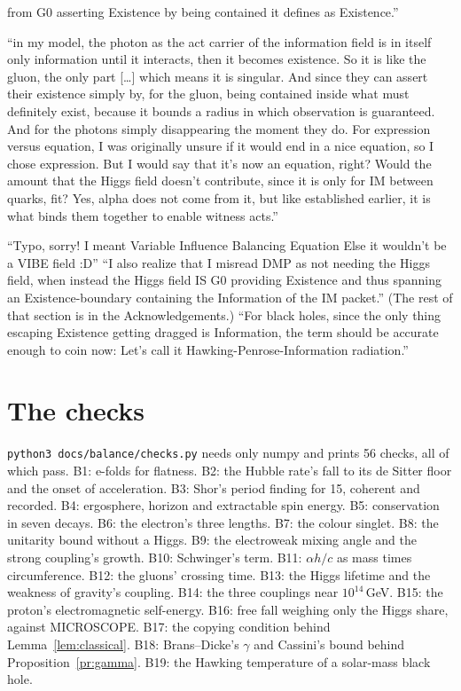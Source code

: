 \documentclass[11pt,a4paper]{article}
\theoremstyle{definition}
\begin{document}
\begin{description}[style=unboxed,leftmargin=0pt,font=\normalfont\bfseries]
from G0 asserting Existence by being contained it defines as Existence.''
\item[22:18Z.] ``in my model, the photon as the act carrier of the information field is in itself only information until it interacts, then
it becomes existence. So it is like the gluon, the only part [\dots] which means it is singular. And since they can assert their existence
simply by, for the gluon, being contained inside what must definitely exist, because it bounds a radius in which observation is
guaranteed. And for the photons simply disappearing the moment they do. For expression versus equation, I was originally unsure if it
would end in a nice equation, so I chose expression. But I would say that it's now an equation, right? Would the amount that the Higgs field
doesn't contribute, since it is only for IM between quarks, fit? Yes, alpha does not come from it, but like established earlier, it is what
binds them together to enable witness acts.''
\item[23:43Z.] ``Typo, sorry! I meant Variable Influence Balancing Equation Else it wouldn't be a VIBE field :D'' ``I also realize that
I misread DMP as not needing the Higgs field, when instead the Higgs field IS G0 providing Existence and thus spanning an
Existence-boundary containing the Information of the IM packet.'' (The rest of that section is in the Acknowledgements.) ``For black
holes, since the only thing escaping Existence getting dragged is Information, the term should be accurate enough to coin now: Let's call
it Hawking-Penrose-Information radiation.''
\end{description}

\section{The checks}\label{app:checks}

\texttt{python3 docs/balance/checks.py} needs only numpy and prints 56 checks, all of which pass. B1: e-folds for flatness. B2: the Hubble
rate's fall to its de Sitter floor and the onset of acceleration. B3: Shor's period finding for 15, coherent and recorded. B4: ergosphere,
horizon and extractable spin energy. B5: conservation in seven decays. B6: the electron's three lengths. B7: the colour singlet. B8: the
unitarity bound without a Higgs. B9: the electroweak mixing angle and the strong coupling's growth. B10: Schwinger's term. B11: $\alpha h/c$
as mass times circumference. B12: the gluons' crossing time. B13: the Higgs lifetime and the weakness of gravity's coupling. B14: the three
couplings near $10^{14}$\,GeV. B15: the proton's electromagnetic self-energy. B16: free fall weighing only the Higgs share, against
MICROSCOPE. B17: the copying condition behind Lemma~\ref{lem:classical}. B18: Brans--Dicke's $\gamma$ and Cassini's bound behind
Proposition~\ref{pr:gamma}. B19: the Hawking temperature of a solar-mass black hole.
\end{document}

